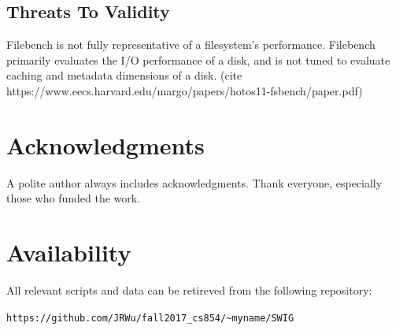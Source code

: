 \documentclass[letterpaper,twocolumn,10pt]{article}
\begin{document}
\subsection{Threats To Validity}
Filebench is not fully representative of a filesystem's performance. Filebench primarily evaluates the I/O performance of a disk, and is not tuned to evaluate caching and metadata dimensions of a disk. (cite https://www.eecs.harvard.edu/margo/papers/hotos11-fsbench/paper.pdf) 




\section{Acknowledgments}

A polite author always includes acknowledgments.  Thank everyone,
especially those who funded the work. 

\section{Availability}\label{Availability}
All relevant scripts and data can be retireved from the following repository:
\begin{center}
{\tt https://github.com/JRWu/fall2017\_cs854/\~{}myname/SWIG}
\end{center}


{\footnotesize 
}


\theendnotes
\end{document}

